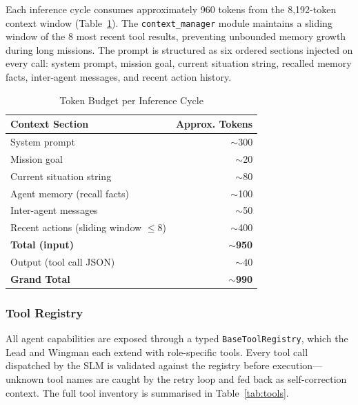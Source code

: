 \documentclass[conference]{IEEEtran}
\begin{document}
Each inference cycle consumes approximately 960 tokens from the 8,192-token context window (Table~\ref{tab:tokens}). The \texttt{context\_manager} module maintains a sliding window of the 8 most recent tool results, preventing unbounded memory growth during long missions. The prompt is structured as six ordered sections injected on every call: system prompt, mission goal, current situation string, recalled memory facts, inter-agent messages, and recent action history.

\begin{table}[htbp]
\caption{Token Budget per Inference Cycle}
\label{tab:tokens}
\centering
\begin{tabular}{lr}
\toprule
\textbf{Context Section} & \textbf{Approx. Tokens} \\
\midrule
System prompt & $\sim$300 \\
Mission goal & $\sim$20 \\
Current situation string & $\sim$80 \\
Agent memory (recall facts) & $\sim$100 \\
Inter-agent messages & $\sim$50 \\
Recent actions (sliding window $\leq$8) & $\sim$400 \\
\midrule
\textbf{Total (input)} & $\sim$\textbf{950} \\
Output (tool call JSON) & $\sim$40 \\
\textbf{Grand Total} & $\sim$\textbf{990} \\
\bottomrule
\end{tabular}
\end{table}

\subsubsection{Tool Registry}

All agent capabilities are exposed through a typed \texttt{BaseToolRegistry}, which the Lead and Wingman each extend with role-specific tools. Every tool call dispatched by the SLM is validated against the registry before execution—unknown tool names are caught by the retry loop and fed back as self-correction context. The full tool inventory is summarised in Table~\ref{tab:tools}.
\end{document}
